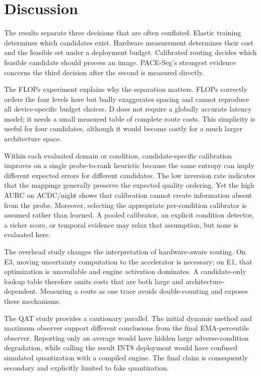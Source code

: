\documentclass[a4paper,review,12pt]{elsarticle}
\newcommand{\method}{PACE-Seg}
\begin{document}


\section{Discussion}
\label{sec:discussion}

The results separate three decisions that are often conflated. Elastic training determines which candidates exist. Hardware measurement determines their cost and the feasible set under a deployment budget. Calibrated routing decides which feasible candidate should process an image. \method{}'s strongest evidence concerns the third decision after the second is measured directly.

The FLOPs experiment explains why the separation matters. FLOPs correctly orders the four levels here but badly exaggerates spacing and cannot reproduce all device-specific budget choices. D does not require a globally accurate latency model; it needs a small measured table of complete route costs. This simplicity is useful for four candidates, although it would become costly for a much larger architecture space.

Within each evaluated domain or condition, candidate-specific calibration improves on a single probe-to-rank heuristic because the same entropy can imply different expected errors for different candidates. The low inversion rate indicates that the mappings generally preserve the expected quality ordering. Yet the high AURC on ACDC/night shows that calibration cannot create information absent from the probe. Moreover, selecting the appropriate per-condition calibrator is assumed rather than learned. A pooled calibrator, an explicit condition detector, a richer score, or temporal evidence may relax that assumption, but none is evaluated here.

The overhead study changes the interpretation of hardware-aware routing. On E3, moving uncertainty computation to the accelerator is necessary; on E1, that optimization is unavailable and engine activation dominates. A candidate-only lookup table therefore omits costs that are both large and architecture-dependent. Measuring a route as one trace avoids double-counting and exposes these mechanisms.

The QAT study provides a cautionary parallel. The initial dynamic method and maximum observer support different conclusions from the final EMA-percentile observer. Reporting only an average would have hidden large adverse-condition degradation, while calling the result INT8 deployment would have confused simulated quantization with a compiled engine. The final claim is consequently secondary and explicitly limited to fake quantization.
\end{document}
